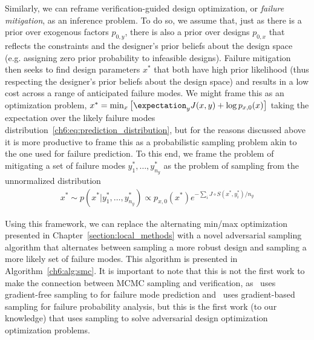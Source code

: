 Similarly, we can reframe verification-guided design optimization, or \textit{failure mitigation}, as an inference problem. To do so, we assume that, just as there is a prior over exogenous factors $p_{0, y}$, there is also a prior over designs $p_{0, x}$ that reflects the constraints and the designer's prior beliefs about the design space (e.g. assigning zero prior probability to infeasible designs). Failure mitigation then seeks to find design parameters $x^*$ that both have high prior likelihood (thus respecting the designer's prior beliefs about the design space) and results in a low cost across a range of anticipated failure modes. We might frame this as an optimization problem, $x^* = \min_x \left[ \expectation_y J(x, y) + \log p_{x, 0}(x) \right]$ taking the expectation over the likely failure modes distribution~\eqref{ch6:eq:prediction_distribution}, but for the reasons discussed above it is more productive to frame this as a probabilistic sampling problem akin to the one used for failure prediction. To this end, we frame the problem of mitigating a set of failure modes $y^*_1, \ldots, y^*_{n_y}$ as the problem of sampling from the unnormalized distribution
\begin{align}
    x^* \sim p(x^* | y^*_1, \ldots, y^*_{n_y}) \propto p_{x, 0}(x^*) e^{-\sum_{i} J\circ S(x^*, y^*_i) / n_y} \label{ch6:eq:mitigation_distribution}
\end{align}

Using this framework, we can replace the alternating min/max optimization presented in Chapter~\ref{section:local_methods} with a novel adversarial sampling algorithm that alternates between sampling a more robust design and sampling a more likely set of failure modes. This algorithm is presented in Algorithm~\ref{ch6:alg:smc}. It is important to note that this is not the first work to make the connection between MCMC sampling and verification, as~\cite{zhouRoCUSRobotController2021} uses gradient-free sampling to for failure mode prediction and~\cite{sinhaNeuralBridgeSampling2020} uses gradient-based sampling for failure probability analysis, but this is the first work (to our knowledge) that uses sampling to solve adversarial design optimization optimization problems.

